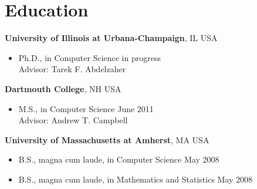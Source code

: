 \section{\sc Education}
{\bf University of Illinois at Urbana-Champaign}, IL USA
\begin{itemize}
\item Ph.D., in Computer Science \hfill in progress \\
Advisor: Tarek F. Abdelzaher
\end{itemize}

{\bf Dartmouth College}, NH USA
\begin{itemize}
\item M.S., in Computer Science \hfill June 2011 \\
Advisor: Andrew T. Campbell
\end{itemize}

{\bf University of Massachusetts at Amherst}, MA USA
\begin{itemize}
\item B.S., magna cum laude, in Computer Science \hfill May 2008\vspace{-1.6mm}
\item B.S., magna cum laude, in Mathematics and Statistics \hfill May 2008
\end{itemize}
